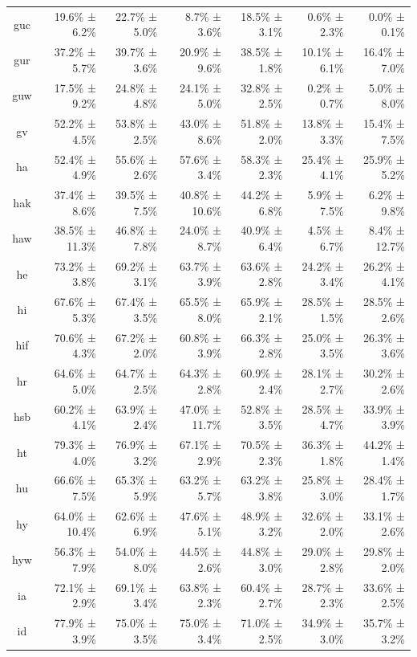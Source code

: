 \documentclass[10pt, a4paper]{article}
\begin{document}
\begin{table}[h]
\begin{tabular}{crrrrrr}
guc & 19.6\% ± 6.2\% & 22.7\% ± 5.0\% & 8.7\% ± 3.6\% & 18.5\% ± 3.1\% & 0.6\% ± 2.3\% & 0.0\% ± 0.1\% \\
gur & 37.2\% ± 5.7\% & 39.7\% ± 3.6\% & 20.9\% ± 9.6\% & 38.5\% ± 1.8\% & 10.1\% ± 6.1\% & 16.4\% ± 7.0\% \\
guw & 17.5\% ± 9.2\% & 24.8\% ± 4.8\% & 24.1\% ± 5.0\% & 32.8\% ± 2.5\% & 0.2\% ± 0.7\% & 5.0\% ± 8.0\% \\
gv & 52.2\% ± 4.5\% & 53.8\% ± 2.5\% & 43.0\% ± 8.6\% & 51.8\% ± 2.0\% & 13.8\% ± 3.3\% & 15.4\% ± 7.5\% \\
ha & 52.4\% ± 4.9\% & 55.6\% ± 2.6\% & 57.6\% ± 3.4\% & 58.3\% ± 2.3\% & 25.4\% ± 4.1\% & 25.9\% ± 5.2\% \\
hak & 37.4\% ± 8.6\% & 39.5\% ± 7.5\% & 40.8\% ± 10.6\% & 44.2\% ± 6.8\% & 5.9\% ± 7.5\% & 6.2\% ± 9.8\% \\
haw & 38.5\% ± 11.3\% & 46.8\% ± 7.8\% & 24.0\% ± 8.7\% & 40.9\% ± 6.4\% & 4.5\% ± 6.7\% & 8.4\% ± 12.7\% \\
he & 73.2\% ± 3.8\% & 69.2\% ± 3.1\% & 63.7\% ± 3.9\% & 63.6\% ± 2.8\% & 24.2\% ± 3.4\% & 26.2\% ± 4.1\% \\
hi & 67.6\% ± 5.3\% & 67.4\% ± 3.5\% & 65.5\% ± 8.0\% & 65.9\% ± 2.1\% & 28.5\% ± 1.5\% & 28.5\% ± 2.6\% \\
hif & 70.6\% ± 4.3\% & 67.2\% ± 2.0\% & 60.8\% ± 3.9\% & 66.3\% ± 2.8\% & 25.0\% ± 3.5\% & 26.3\% ± 3.6\% \\
hr & 64.6\% ± 5.0\% & 64.7\% ± 2.5\% & 64.3\% ± 2.8\% & 60.9\% ± 2.4\% & 28.1\% ± 2.7\% & 30.2\% ± 2.6\% \\
hsb & 60.2\% ± 4.1\% & 63.9\% ± 2.4\% & 47.0\% ± 11.7\% & 52.8\% ± 3.5\% & 28.5\% ± 4.7\% & 33.9\% ± 3.9\% \\
ht & 79.3\% ± 4.0\% & 76.9\% ± 3.2\% & 67.1\% ± 2.9\% & 70.5\% ± 2.3\% & 36.3\% ± 1.8\% & 44.2\% ± 1.4\% \\
hu & 66.6\% ± 7.5\% & 65.3\% ± 5.9\% & 63.2\% ± 5.7\% & 63.2\% ± 3.8\% & 25.8\% ± 3.0\% & 28.4\% ± 1.7\% \\
hy & 64.0\% ± 10.4\% & 62.6\% ± 6.9\% & 47.6\% ± 5.1\% & 48.9\% ± 3.2\% & 32.6\% ± 2.0\% & 33.1\% ± 2.6\% \\
hyw & 56.3\% ± 7.9\% & 54.0\% ± 8.0\% & 44.5\% ± 2.6\% & 44.8\% ± 3.0\% & 29.0\% ± 2.8\% & 29.8\% ± 2.0\% \\
ia & 72.1\% ± 2.9\% & 69.1\% ± 3.4\% & 63.8\% ± 2.3\% & 60.4\% ± 2.7\% & 28.7\% ± 2.3\% & 33.6\% ± 2.5\% \\
id & 77.9\% ± 3.9\% & 75.0\% ± 3.5\% & 75.0\% ± 3.4\% & 71.0\% ± 2.5\% & 34.9\% ± 3.0\% & 35.7\% ± 3.2\% \\

\end{tabular}
\end{table}
\end{document}
